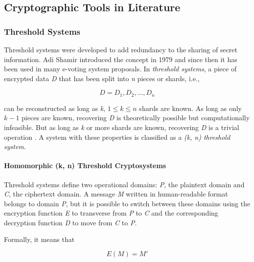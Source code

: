 \documentclass[../access.tex]{subfiles}
\begin{document}
    \subsection {Cryptographic Tools in Literature}
        \label{cryptographic-methods}
        \subsubsection{Threshold Systems}
            \label{threshold_systems}            
            Threshold systems were developed to add redundancy to the sharing of secret information. Adi Shamir introduced the concept in 1979 \cite{Shamir1979} and since then it has been used in many e-voting system proposals. In \textit{threshold systems}, a piece of encrypted data \textit{D} that has been split into \textit{n} pieces or shards, i.e.,
            
            \begin{equation}
            D = D_{1}, D_{2},..., D_{n}
            \end{equation}
            
            can be reconstructed as long as \textit{k}, $ 1 \leq k \leq n $ shards are known. As long as only $ k - 1 $ pieces are known, recovering \textit{D} is theoretically possible but computationally infeasible. But as long as \textit{k} or more shards are known, recovering \textit{D} is a trivial operation \cite{Benaloh1986b}.
            A system with these properties is classified as a \textit{(k, n) threshold system}.
        
            \paragraph{Homomorphic (k, n) Threshold Cryptosystems}
                Threshold systems define two operational domains: \textit{P}, the plaintext domain and \textit{C}, the ciphertext domain. A message \textit{M} written in human-readable format belongs to domain \textit{P}, but it is possible to switch between these domains using the encryption function \textit{E} to transverse from \textit{P} to \textit{C} and the corresponding decryption function \textit{D} to move from \textit{C} to \textit{P}.
                \par
                Formally, it means that 
                
                \begin{equation}
                    E(M) = M'
                \end{equation}
                
\end{document}
